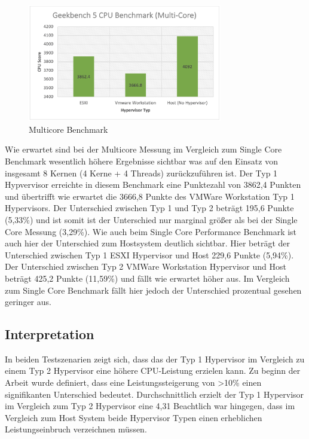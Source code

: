 \documentclass[conference]{IEEEtran}
\begin{document}
\begin{figure}[!h]
	\centering
	\includegraphics[keepaspectratio,width=8.5cm,height=0.75\textheight]{multicore.png}
	\caption{Multicore Benchmark}
	\label{architecture}
\end{figure}

Wie erwartet sind bei der Multicore Messung im Vergleich zum Single Core Benchmark wesentlich höhere Ergebnisse sichtbar was auf den Einsatz von insgesamt 8 Kernen (4 Kerne + 4 Threads) zurückzuführen ist. Der Typ 1 Hypvervisor erreichte in diesem Benchmark eine Punktezahl von 3862,4 Punkten und übertrifft wie erwartet die 3666,8 Punkte des VMWare Workstation Typ 1 Hypervisors. Der Unterschied zwischen Typ 1 und Typ 2 beträgt 195,6 Punkte (5,33\%) und ist somit ist der Unterschied nur marginal größer als bei der Single Core Messung (3,29\%). Wie auch beim Single Core Performance Benchmark ist auch hier der Unterschied zum Hostsystem deutlich sichtbar. Hier beträgt der Unterschied zwischen Typ 1 ESXI Hypervisor und Host 229,6 Punkte (5,94\%). Der Unterschied zwischen Typ 2 VMWare Workstation Hypervisor und Host beträgt 425,2 Punkte (11,59\%) und fällt wie erwartet höher aus. Im Vergleich zum Single Core Benchmark fällt hier jedoch der Unterschied prozentual gesehen geringer aus.


\subsection{Interpretation}
In beiden Testszenarien zeigt sich, dass das der Typ 1 Hypervisor im Vergleich zu einem Typ 2 Hypervisor eine höhere CPU-Leistung erzielen kann. Zu beginn der Arbeit wurde definiert, dass eine Leistungssteigerung von >10\% einen signifikanten Unterschied bedeutet. Durchschnittlich erzielt der Typ 1 Hypervisor im Vergleich zum Typ 2 Hypervisor eine 4,31%
Beachtlich war hingegen, dass im Vergleich zum Host System beide Hypervisor Typen einen erheblichen Leistungseinbruch verzeichnen müssen.
\end{document}
